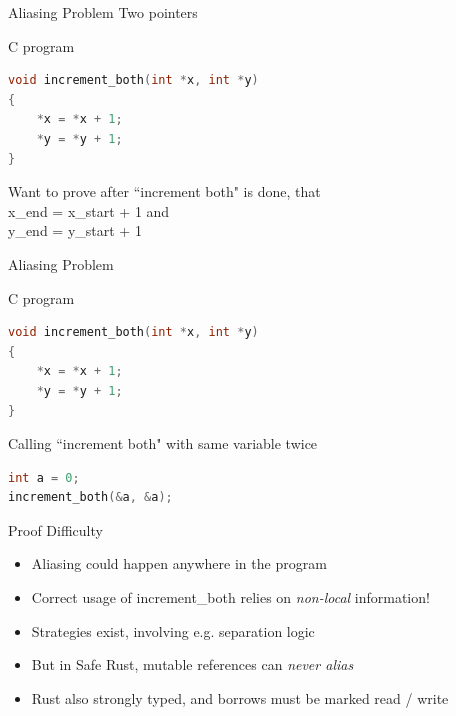 \documentclass{beamer}
\begin{document}
\begin{frame}[fragile]{Aliasing Problem}
Two pointers
\begin{block}{C program}
\begin{lstlisting}[language=C]
void increment_both(int *x, int *y)
{
    *x = *x + 1; 
    *y = *y + 1;   
}
 \end{lstlisting}
\end{block}

Want to prove after ``increment both" is done, that\\
x\_end = x\_start + 1 and \\
y\_end = y\_start + 1

\end{frame}

\begin{frame}[fragile]{Aliasing Problem}
\begin{block}{C program}
\begin{lstlisting}[language=C]
void increment_both(int *x, int *y)
{
    *x = *x + 1; 
    *y = *y + 1;   
}
 \end{lstlisting}
\end{block}

\begin{block}{Calling ``increment both" with same variable twice}
\begin{lstlisting}[language=C]
int a = 0;
increment_both(&a, &a); 
\end{lstlisting}
\end{block}
\end{frame}

\begin{frame}{Proof Difficulty}
\begin{itemize}
\item
Aliasing could happen anywhere in the program
\item
Correct usage of increment\_both relies on \emph{non-local} information!
\item
Strategies exist, involving e.g. separation logic
\item But in Safe Rust, mutable references can \emph{never alias}
\item Rust also strongly typed, and borrows must be marked read / write
\end{itemize} 
\end{frame}
\end{document}
